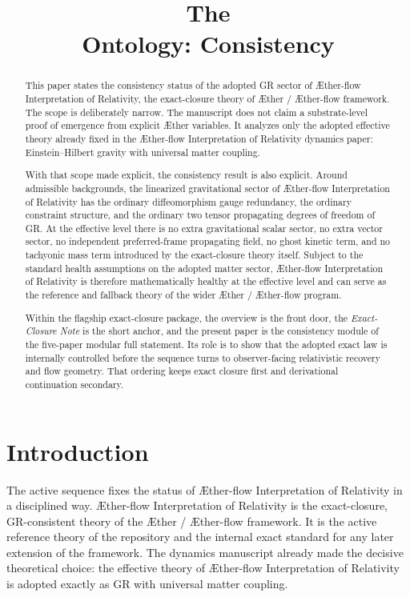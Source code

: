 \documentclass[11pt]{article}
\title{The \TheoryName{}\\[0.4em]
Ontology: Consistency}
\author{}
\date{}
\newcommand{\Aether}{\AE{}ther}
\newcommand{\Aflow}{\AE{}ther-flow}
\newcommand{\TheoryName}{\Aflow{} Interpretation of Relativity}
\newcommand{\TheoryProgram}{\Aether{} / \Aflow{} framework}
\begin{document}
\AetherFlowAPATitlePage

\begin{abstract}
This paper states the consistency status of the adopted GR sector of \TheoryName{}, the exact-closure theory of \TheoryProgram{}. The scope is deliberately narrow. The manuscript does not claim a substrate-level proof of emergence from explicit \Aether{} variables. It analyzes only the adopted effective theory already fixed in the \TheoryName{} dynamics paper: Einstein--Hilbert gravity with universal matter coupling.

With that scope made explicit, the consistency result is also explicit. Around admissible backgrounds, the linearized gravitational sector of \TheoryName{} has the ordinary diffeomorphism gauge redundancy, the ordinary constraint structure, and the ordinary two tensor propagating degrees of freedom of GR. At the effective level there is no extra gravitational scalar sector, no extra vector sector, no independent preferred-frame propagating field, no ghost kinetic term, and no tachyonic mass term introduced by the exact-closure theory itself. Subject to the standard health assumptions on the adopted matter sector, \TheoryName{} is therefore mathematically healthy at the effective level and can serve as the reference and fallback theory of the wider \Aether{} / \Aflow{} program.

Within the flagship exact-closure package, the overview is the front door, the \emph{Exact-Closure Note} is the short anchor, and the present paper is the consistency module of the five-paper modular full statement. Its role is to show that the adopted exact law is internally controlled before the sequence turns to observer-facing relativistic recovery and flow geometry. That ordering keeps exact closure first and derivational continuation secondary.
\end{abstract}

\section{Introduction}

The active sequence fixes the status of \TheoryName{} in a disciplined way. \TheoryName{} is the exact-closure, GR-consistent theory of the \TheoryProgram{}. It is the active reference theory of the repository and the internal exact standard for any later extension of the framework. The dynamics manuscript already made the decisive theoretical choice: the effective theory of \TheoryName{} is adopted exactly as GR with universal matter coupling.
\end{document}
